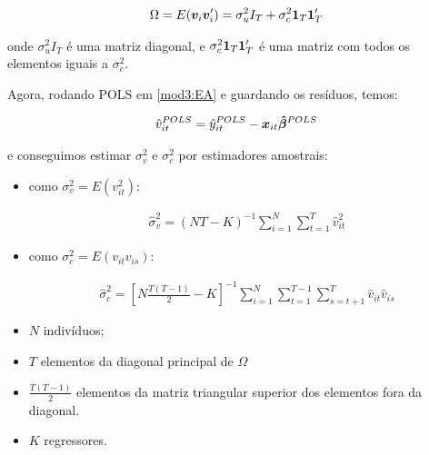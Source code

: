 \documentclass[11pt,oneside,a4paper]{article}
\numberwithin{equation}{section}
\begin{document}
\vspace{-1 em}
\begin{align*}
\Omega 
= 
E(\boldsymbol{v}_{i} \boldsymbol{v}_{i}') = \sigma^{2}_{u} I_{T} + \sigma_{c}^{2} \boldsymbol{1}_{T} \boldsymbol{1}_{T}'
\end{align*}

\noindent
onde
$\sigma^{2}_{u} I_{T}$ 
é uma matriz diagonal, e 
$\sigma_{c}^{2} \boldsymbol{1}_{T} \boldsymbol{1}_{T}'$ é uma matriz com todos os elementos iguais a $\sigma_{c}^{2}$.

Agora, rodando POLS em \eqref{mod3:EA} e guardando os resíduos, temos:

\vspace{-1 em}
\begin{align*}
\hat{v}_{it}^{POLS}
= 
\hat{y}_{it}^{POLS} - \boldsymbol{x}_{it} \boldsymbol{\hat{\beta}}^{POLS}
\end{align*}

\noindent
e conseguimos estimar $\sigma_{v}^{2}$ e $\sigma_{c}^{2}$ por estimadores amostrais:

\begin{itemize}\itemsep0pt
\item 
como $\sigma_{v}^{2} = E(v_{it}^{2})$:

\vspace{-1.5 em}
\begin{align*}
\hat{\sigma}_{v}^{2} =
(NT - K)^{-1} 
\sum_{i=1}^{N}
\sum_{t=1}^{T}
\hat{v}_{it}^2
\end{align*}
\vspace{-1.5 em}

\item 
como $\sigma_{c}^{2} = E(v_{it} v_{is})$:

\vspace{-1.5 em}
\begin{align*}
\hat{\sigma}_{c}^{2} =
\left[ N \frac{T ( T-1 )}{2} - K  \right]^{-1}
\sum_{i=1}^{N}
\sum_{t=1}^{T-1}
\sum_{s=t+1}^{T}
\hat{v}_{it} \hat{v}_{is}
\end{align*}
\vspace{-1.5 em}

\item $N$ indivíduos;

\item $T$ elementos da diagonal principal de $\Omega$

\item $\frac{T ( T - 1)}{2}$ elementos da matriz triangular superior dos elementos fora da diagonal.

\item $K$ regressores.
\end{itemize}
\end{document}
